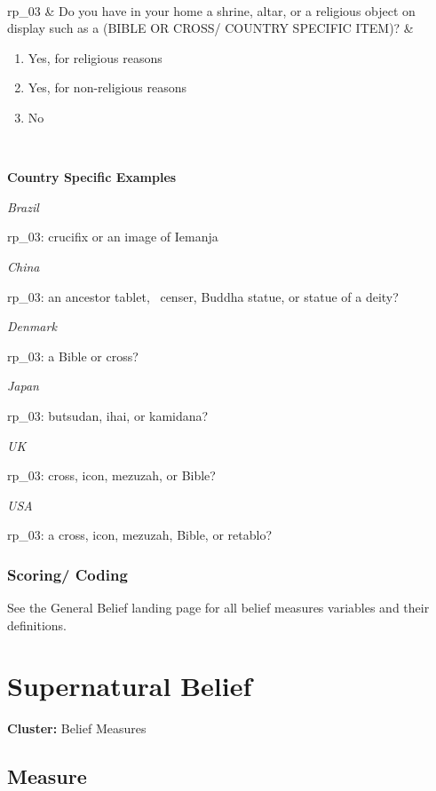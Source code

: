 \documentclass[
  letterpaper,
]{scrbook}
\providecommand{\tightlist}{%
  \setlength{\itemsep}{0pt}\setlength{\parskip}{0pt}}\usepackage{longtable,booktabs,array}
\begin{document}
\begin{longtable}[]
\begin{minipage}[t]{\linewidth}
\begin{enumerate}
\end{enumerate}
\end{minipage} \\
rp\_03 & Do you have in your home a shrine, altar, or a religious object
on display such as a (BIBLE OR CROSS/ COUNTRY SPECIFIC ITEM)? &
\begin{minipage}[t]{\linewidth}\raggedright
\begin{enumerate}
\def\labelenumi{\arabic{enumi}.}
\tightlist
\item
  Yes, for religious reasons
\item
  Yes, for non-religious reasons
\item
  No
\end{enumerate}
\end{minipage} \\
\end{longtable}

\textbf{Country Specific Examples}

\emph{Brazil}

rp\_03: crucifix or an image of Iemanja

\emph{China}

rp\_03: an ancestor tablet, ~censer, Buddha statue, or statue of a
deity?

\emph{Denmark}

rp\_03: a Bible or cross?

\emph{Japan}

rp\_03: butsudan, ihai, or kamidana?

\emph{UK}

rp\_03: cross, icon, mezuzah, or Bible?

\emph{USA}

rp\_03: a cross, icon, mezuzah, Bible, or retablo?

\subsection{Scoring/ Coding}\label{scoring-coding-1}

See the General Belief landing page for all belief measures variables
and their definitions.

\chapter{Supernatural Belief}\label{supernatural-belief-1}

\textbf{Cluster:} Belief Measures

\section{Measure}\label{measure-21}
\end{document}
